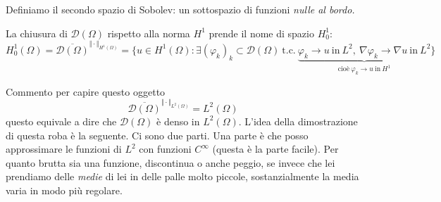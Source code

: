 \documentclass[10pt,a4paper,twoside,openright]{book}
\begin{document}
Definiamo il secondo spazio di Sobolev: un sottospazio di funzioni \textit{nulle al bordo.}
\begin{definition}
    La chiusura di $\mathcal{D}(\Omega)$ rispetto alla norma $H^{1}$ prende il nome di spazio $H^{1}_{0}$:
    \begin{equation*}
        H^{1}_{0}(\Omega) =\overline{\mathcal{D}(\Omega)}^{\Vert \cdotp \Vert _{H^{1}(\Omega)}}
        =\bigg\{u\in H^{1}(\Omega) :\exists (\varphi _{k})_{k} \subset \mathcal{D}(\Omega) \ \text{t.c.} \ \underbrace{\varphi _{k}\rightarrow u\ \text{in} \ L^{2} ,\ \nabla \varphi _{k}\rightarrow \nabla u\ \text{in} \ L^{2}}_{\text{cioè} \ \varphi _{k}\rightarrow u\ \text{in} \ H^{1}}\bigg\}
    \end{equation*}
\end{definition}
Commento per capire questo oggetto
\begin{equation*}
    \overline{\mathcal{D}(\Omega)}^{\Vert \cdotp \Vert _{L^{2}(\Omega)}} =L^{2}(\Omega)
\end{equation*}
questo equivale a dire che $\mathcal{D}(\Omega)$ è denso in $L^{2}(\Omega)$. L'idea della dimostrazione di questa roba è la seguente. Ci sono due parti. Una parte è che posso approssimare le funzioni di $L^{2}$ con funzioni $C^{\infty }$ (questa è la parte facile). Per quanto brutta sia una funzione, discontinua o anche peggio, se invece che lei prendiamo delle \textit{medie} di lei in delle palle molto piccole, sostanzialmente la media varia in modo più regolare.
\end{document}
